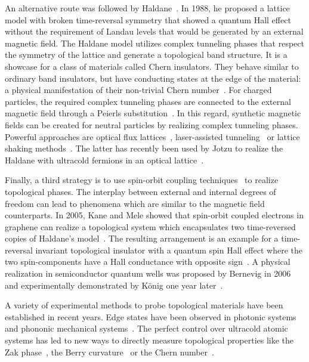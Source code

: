 An alternative route was followed by Haldane~\cite{Haldane1988}.
In 1988, he proposed a lattice model with broken time-reversal symmetry that showed a quantum Hall effect without the requirement of Landau levels that would be generated by an external magnetic field.
The Haldane model utilizes complex tunneling phases that respect the symmetry of the lattice and generate a topological band structure.
It is a showcase for a class of materials called Chern insulators.
They behave similar to ordinary band insulators, but have conducting states at the edge of the material: a physical manifestation of their non-trivial Chern number~\cite{Hatsugai1993}.
For charged particles, the required complex tunneling phases are connected to the external magnetic field through a Peierls substitution~\cite{Peierls1933}.
In this regard, synthetic magnetic fields can be created for neutral particles by realizing complex tunneling phases.
Powerful approaches are optical flux lattices~\cite{Cooper2011}, laser-assisted tunneling~\cite{Aidelsburger2011,Aidelsburger2013,Miyake2013,Kennedy2015} or lattice shaking methods~\cite{Struck2012,Struck2013}.
The latter has recently been used by Jotzu \etal to realize the Haldane  with ultracold fermions in an optical lattice~\cite{Jotzu2014}.

Finally, a third strategy is to use spin-orbit coupling techniques~\cite{Lin2011,Cheuk2012,Wang2012,Hamner2014,Jimenez-Garcia2015} to realize topological phases.
The interplay between external and internal degrees of freedom can lead to phenomena which are similar to the magnetic field counterparts.
In 2005, Kane and Mele showed that spin-orbit coupled electrons in graphene can realize a topological system which encapsulates two time-reversed copies of Haldane's model~\cite{Kane2005a,Kane2005}.
The resulting arrangement is an example for a time-reversal invariant topological insulator with a quantum spin Hall effect where the two spin-components have a Hall conductance with opposite sign~\cite{Qi2011,Hasan2010}.
A physical realization in semiconductor quantum wells was proposed by Bernevig \etal in 2006~\cite{Bernevig2006a,Bernevig2006b} and experimentally demonstrated by König \etal one year later~\cite{Konig2007}.

A variety of experimental methods to probe topological materials have been established in recent years.
Edge states have been observed in photonic systems~\cite{Hafezi2011a,Hafezi2013,Rechtsman2013} and phononic mechanical systems~\cite{Susstrunk2015}.
The perfect control over ultracold atomic systems has led to new ways to directly measure topological properties like the Zak phase~\cite{Atala2013}, the Berry curvature~\cite{Duca2014} or the Chern number~\cite{Aidelsburger2014}.



%
